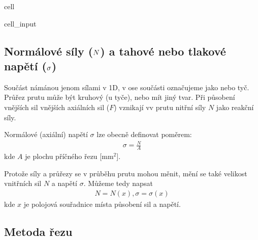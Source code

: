 \documentclass[letterpaper,10pt,english]{jupyterBook}
\begin{document}
{{\begin{sphinxuseclass}{cell}
\begin{sphinxVerbatimInput}
\begin{sphinxuseclass}{cell_input}
\begin{sphinxVerbatim}[commandchars=\\\{\}]
   
\end{sphinxVerbatim}

\end{sphinxuseclass}\end{sphinxVerbatimInput}

\end{sphinxuseclass}

\subsection{Normálové síly (\protect\(N\protect\)) a tahové nebo tlakové napětí (\protect\(\sigma\protect\))}
\label{\detokenize{Prednasky/2_5_Metoda__u0159ezu:normalove-sily-n-a-tahove-nebo-tlakove-napeti-sigma}}
\sphinxAtStartPar
Součást námánou jenom sílami v 1D, v ose součásti označujeme jako  nebo tyč. Průřez prutu může být kruhový (u tyče), nebo mít jiný tvar. Při působení vnějších sil vnějších axiálních sil (\(F\)) vznikají vv prutu nitřní síly \(N\) jako reakční síly.

\sphinxAtStartPar
Normálové (axiální) napětí \(\sigma\) lze obecně definovat poměrem:
\begin{equation*}
\begin{split}\sigma = \frac{N}{A}\end{split}
\end{equation*}
\sphinxAtStartPar
kde \(A\) je plochu příčného řezu {[}mm\(^2\){]}.

\sphinxAtStartPar
Protože síly a průřezy se v průběhu prutu mohou měnit, mění se také velikost vnitřních sil \(N\) a napětí \(\sigma\). Můžeme tedy napsat
\begin{equation*}
\begin{split}N=N(x), \sigma = \sigma(x) \end{split}
\end{equation*}
\sphinxAtStartPar
kde \(x\) je polojová souřadnice místa působení sil a napětí.


\subsection{Metoda řezu}
\label{\detokenize{Prednasky/2_5_Metoda__u0159ezu:metoda-rezu}}

}}
\end{document}
